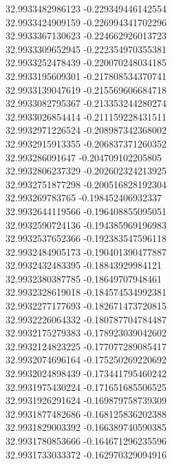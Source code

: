 {32.9933482986123	-0.229349446142554\\
32.9933424909159	-0.226994341702296\\
32.9933367130623	-0.224662926013723\\
32.9933309652945	-0.222354970355381\\
32.9933252478439	-0.220070248034185\\
32.9933195609301	-0.217808534370741\\
32.9933139047619	-0.215569606684718\\
32.9933082795367	-0.213353244280274\\
32.9933026854414	-0.211159228431511\\
32.9932971226524	-0.208987342368002\\
32.9932915913355	-0.206837371260352\\
32.993286091647	-0.204709102205805\\
32.9932806237329	-0.202602324213925\\
32.9932751877298	-0.200516828192304\\
32.993269783765	-0.198452406932337\\
32.9932644119566	-0.196408855095051\\
32.9932590724136	-0.194385969196983\\
32.9932537652366	-0.192383547596118\\
32.9932484905173	-0.190401390477887\\
32.9932432483395	-0.18843929984121\\
32.9932380387785	-0.18649707948461\\
32.9932328619018	-0.184574534992381\\
32.9932277177693	-0.182671473720815\\
32.9932226064332	-0.180787704784487\\
32.9932175279383	-0.178923039042602\\
32.9932124823225	-0.177077289085417\\
32.9932074696164	-0.175250269220692\\
32.9932024898439	-0.173441795460242\\
32.9931975430224	-0.171651685506525\\
32.9931926291624	-0.169879758739309\\
32.9931877482686	-0.168125836202388\\
32.9931829003392	-0.166389740590385\\
32.9931780853666	-0.164671296235596\\
32.9931733033372	-0.162970329094916\\
}
